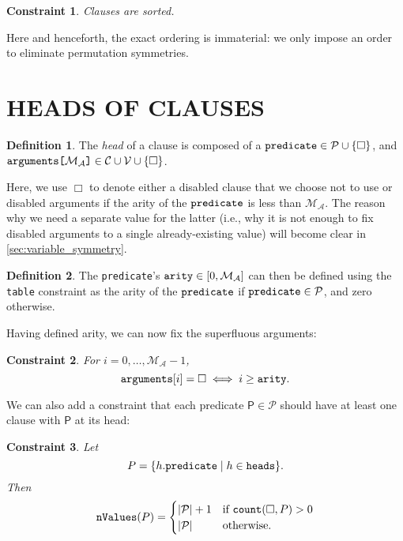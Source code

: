 \documentclass[letterpaper]{article}
\newtheorem{constraint}{Constraint}
\theoremstyle{definition}
\newtheorem{definition}{Definition}
\newcommand{\variable}[1]{\texttt{\textup{#1}}}
\newcommand{\arrayd}[3]{\variable{{#1}[}{#2}\variable{]} \in {#3}}
\newcommand{\predicates}{\mathcal{P}}
\newcommand{\variables}{\mathcal{V}}
\newcommand{\constants}{\mathcal{C}}
\newcommand{\maxArity}{\mathcal{M}_{\mathcal{A}}}
\begin{document}
\begin{constraint}
  Clauses are sorted.
\end{constraint}

Here and henceforth, the exact ordering is immaterial: we only impose an order
to eliminate permutation symmetries.

\section{HEADS OF CLAUSES}

\begin{definition}
  The \emph{head} of a clause is composed of a $\variable{predicate} \in
  \predicates \cup \{ \Box \}$, and
  $\arrayd{arguments}{\maxArity{}}{\constants{} \cup \variables{}} \cup \{ \Box
  \}$.
\end{definition}

Here, we use $\Box$ to denote either a disabled clause that we choose not to use
or disabled arguments if the arity of the $\variable{predicate}$ is less than
$\maxArity{}$. The reason why we need a separate value for the latter (i.e., why
it is not enough to fix disabled arguments to a single already-existing value)
will become clear in \cref{sec:variable_symmetry}.

\begin{definition} \label{def:arity}
  The \variable{predicate}'s $\variable{arity} \in [0, \maxArity{}]$ can then be
  defined using the \variable{table} constraint as the arity of the
  $\variable{predicate}$ if $\variable{predicate} \in \predicates{}$, and zero
  otherwise.
\end{definition}

Having defined arity, we can now fix the superfluous arguments:

\begin{constraint} \label{constr:arity}
  For $i = 0, \dots, \maxArity{} - 1$,
  \[
    \variable{arguments}[i] = \Box \iff i \ge \variable{arity}.
  \]
\end{constraint}

We can also add a constraint that each predicate $\mathsf{P} \in \predicates{}$
should have at least one clause with $\mathsf{P}$ at its head:

\begin{constraint}
Let
  \[
    P = \{ h.\variable{predicate} \mid h \in \variable{heads} \}.
  \]
  Then
  \[
    \variable{nValues}(P) =
    \begin{cases}
      |\predicates{}| + 1 & \text{if } \variable{count}(\Box, P) > 0 \\
      |\predicates{}| & \text{otherwise.}
    \end{cases}
  \]
\end{constraint}
\end{document}
